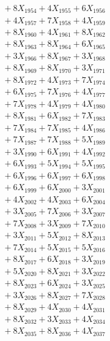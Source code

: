 \documentclass[a4paper,10pt]{article}
\begin{document}
{\begin{align}
&\;  + 8 X_{1954} + 4 X_{1955} + 6 X_{1956} \\[0.3ex]
&\;  + 4 X_{1957} + 7 X_{1958} + 4 X_{1959} \\[0.5ex]\allowbreak
&\;  + 8 X_{1960} + 4 X_{1961} + 8 X_{1962} \\[0.3ex]
&\;  + 8 X_{1963} + 8 X_{1964} + 6 X_{1965} \\[0.3ex]
&\;  + 3 X_{1966} + 8 X_{1967} + 3 X_{1968} \\[0.3ex]
&\;  + 8 X_{1969} + 8 X_{1970} + 3 X_{1971} \\[0.3ex]
&\;  + 8 X_{1972} + 4 X_{1973} + 7 X_{1974} \\[0.3ex]
&\;  + 6 X_{1975} + 7 X_{1976} + 4 X_{1977} \\[0.3ex]
&\;  + 7 X_{1978} + 4 X_{1979} + 4 X_{1980} \\[0.3ex]
&\;  + 8 X_{1981} + 6 X_{1982} + 7 X_{1983} \\[0.3ex]
&\;  + 7 X_{1984} + 7 X_{1985} + 4 X_{1986} \\[0.3ex]
&\;  + 7 X_{1987} + 7 X_{1988} + 5 X_{1989} \\[0.5ex]\allowbreak
&\;  + 3 X_{1990} + 6 X_{1991} + 4 X_{1992} \\[0.3ex]
&\;  + 6 X_{1993} + 5 X_{1994} + 5 X_{1995} \\[0.3ex]
&\;  + 6 X_{1996} + 6 X_{1997} + 6 X_{1998} \\[0.3ex]
&\;  + 6 X_{1999} + 6 X_{2000} + 3 X_{2001} \\[0.3ex]
&\;  + 4 X_{2002} + 4 X_{2003} + 6 X_{2004} \\[0.3ex]
&\;  + 3 X_{2005} + 7 X_{2006} + 3 X_{2007} \\[0.3ex]
&\;  + 7 X_{2008} + 3 X_{2009} + 7 X_{2010} \\[0.3ex]
&\;  + 3 X_{2011} + 5 X_{2012} + 8 X_{2013} \\[0.3ex]
&\;  + 7 X_{2014} + 5 X_{2015} + 5 X_{2016} \\[0.3ex]
&\;  + 8 X_{2017} + 6 X_{2018} + 3 X_{2019} \\[0.5ex]\allowbreak
&\;  + 5 X_{2020} + 8 X_{2021} + 3 X_{2022} \\[0.3ex]
&\;  + 8 X_{2023} + 6 X_{2024} + 3 X_{2025} \\[0.3ex]
&\;  + 3 X_{2026} + 8 X_{2027} + 7 X_{2028} \\[0.3ex]
&\;  + 8 X_{2029} + 4 X_{2030} + 4 X_{2031} \\[0.3ex]
&\;  + 8 X_{2032} + 3 X_{2033} + 4 X_{2034} \\[0.3ex]
&\;  + 8 X_{2035} + 8 X_{2036} + 4 X_{2037} \\[0.3ex]

\end{align}}
\end{document}
